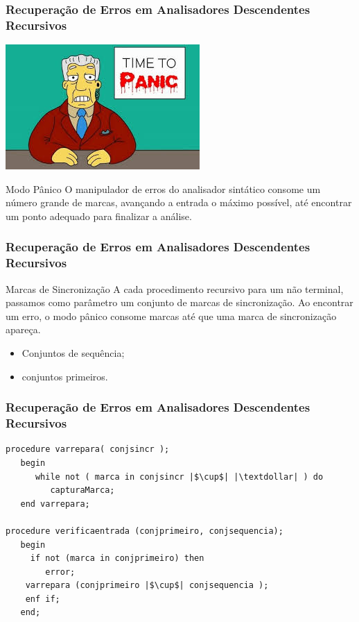 \documentclass[table]{beamer}
\begin{document}
\begin{frame}
   \frametitle{Recuperação de Erros em Analisadores Descendentes Recursivos}
   \begin{center}
   \includegraphics[scale=0.5]{figuras/panico.jpeg}
   \end{center}
   \begin{block}{Modo Pânico}
   O manipulador de erros do analisador sintático consome um número grande de marcas, avançando a entrada o máximo possível, até encontrar um ponto adequado para finalizar a análise.
   \end{block}
\end{frame}

\begin{frame}
   \frametitle{Recuperação de Erros em Analisadores Descendentes Recursivos}
   \begin{block}{Marcas de Sincronização}
   A cada procedimento recursivo para um não terminal, passamos como parâmetro um conjunto de marcas de sincronização. Ao encontrar um erro, o modo pânico consome marcas até que uma marca de sincronização apareça.
   \begin{itemize}
      \item Conjuntos de sequência;
      \item conjuntos primeiros.
   \end{itemize}
   \end{block}
\end{frame}


\begin{frame}[fragile]
   \frametitle{Recuperação de Erros em Analisadores Descendentes Recursivos}
   \begin{verbatim}
procedure varrepara( conjsincr );
   begin
      while not ( marca in conjsincr |$\cup$| |\textdollar| ) do
         capturaMarca;
   end varrepara;

procedure verificaentrada (conjprimeiro, conjsequencia);
   begin
     if not (marca in conjprimeiro) then
        error;
	varrepara (conjprimeiro |$\cup$| conjsequencia );
	enf if;
   end;
   \end{verbatim}
\end{frame}
\end{document}

